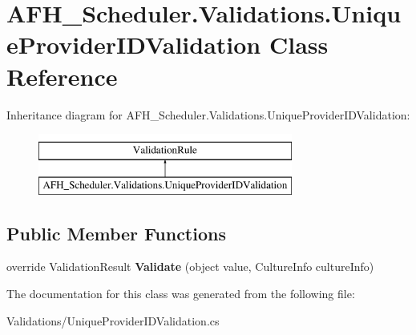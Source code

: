 \section{A\+F\+H\+\_\+\+Scheduler.\+Validations.\+Unique\+Provider\+I\+D\+Validation Class Reference}
\label{class_a_f_h___scheduler_1_1_validations_1_1_unique_provider_i_d_validation}
Inheritance diagram for A\+F\+H\+\_\+\+Scheduler.\+Validations.\+Unique\+Provider\+I\+D\+Validation\+:\begin{figure}[H]
\begin{center}
\leavevmode
\includegraphics[height=2.000000cm]{class_a_f_h___scheduler_1_1_validations_1_1_unique_provider_i_d_validation}
\end{center}
\end{figure}
\subsection*{Public Member Functions}
\begin{DoxyCompactItemize}
\item 
\mbox{\label{class_a_f_h___scheduler_1_1_validations_1_1_unique_provider_i_d_validation_af92fdbfc2c1088fc3dffddd0ae3140b6}} 
override Validation\+Result {\bfseries Validate} (object value, Culture\+Info culture\+Info)
\end{DoxyCompactItemize}


The documentation for this class was generated from the following file\+:\begin{DoxyCompactItemize}
\item 
Validations/Unique\+Provider\+I\+D\+Validation.\+cs\end{DoxyCompactItemize}
